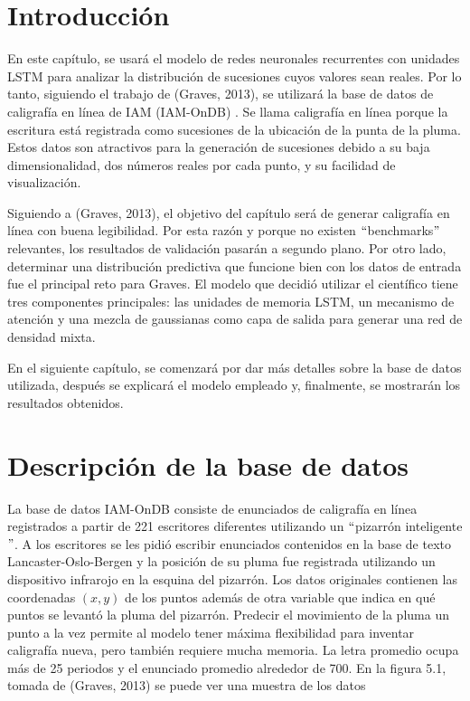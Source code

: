 \section{Introducción}
En este capítulo, se usará el modelo de redes neuronales recurrentes con unidades LSTM para analizar la distribución de sucesiones cuyos valores sean reales. Por lo tanto, siguiendo el trabajo de (Graves, 2013), se utilizará la base de datos de caligrafía en línea de IAM (IAM-OnDB) \cite{handwriting}. 
Se llama caligrafía en línea porque la escritura está registrada como sucesiones de la ubicación de la punta de la pluma. Estos datos son atractivos para la generación de sucesiones debido a su baja dimensionalidad, dos números reales por cada punto, y su facilidad de visualización. 
\cite{handwriting}
\cite{DBLP:journals/corr/Graves13}


\vspace{1em}

Siguiendo a (Graves, 2013), el objetivo del capítulo será de generar caligrafía en línea con buena legibilidad. Por esta razón y porque no existen $``$benchmarks$"$ relevantes, los resultados de validación pasarán a segundo plano. Por otro lado, determinar una distribución predictiva que funcione bien con los datos de entrada fue el principal reto para Graves. El modelo que decidió utilizar el científico tiene tres componentes principales: las unidades de memoria LSTM, un mecanismo de atención y una mezcla de gaussianas como capa de salida para generar una red de densidad mixta. 

\vspace{1em}

En el siguiente capítulo, se comenzará por dar más detalles sobre la base de datos utilizada, después se explicará el modelo empleado y, finalmente, se mostrarán los resultados obtenidos.


\section{Descripción de la base de datos}
La base de datos IAM-OnDB consiste de enunciados de caligrafía en línea registrados a partir de 221 escritores diferentes utilizando un $``$pizarrón inteligente$"$. A los escritores se les pidió escribir enunciados contenidos en la base de texto Lancaster-Oslo-Bergen y la posición de su pluma fue registrada utilizando un dispositivo infrarojo en la esquina del pizarrón. Los datos originales contienen las coordenadas $(x,y)$ de los puntos además de otra variable que indica en qué puntos se levantó la pluma del pizarrón. Predecir el movimiento de la pluma un punto a la vez permite al modelo tener máxima flexibilidad para inventar caligrafía nueva, pero también requiere mucha memoria. La letra promedio ocupa más de 25 periodos y el enunciado promedio alrededor de 700. En la figura 5.1, tomada de (Graves, 2013) se puede ver una muestra de los datos
\cite{DBLP:journals/corr/Graves13}

